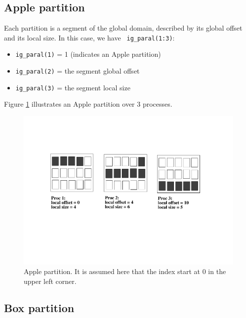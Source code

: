\subsection{Apple partition} 

Each partition is a segment of the global domain, described by its
global offset and its local size. In this case, we have {\tt
ig\_paral(1:3)}:
\begin{itemize}
 \item {\tt ig\_paral(1)} = 1 (indicates an Apple partition)
 \item {\tt ig\_paral(2)} = the segment global offset
 \item {\tt ig\_paral(3)} = the segment local size
\end{itemize}

Figure \ref{apple_partition} illustrates an Apple partition over 3
processes. 
\begin{figure}
\includegraphics[scale=.6]{figures/apple_new} 
\caption{Apple partition. It is assumed here that the index start at 0 in the upper left corner.}
\label{apple_partition}
\end{figure}


\subsection{Box partition} 

